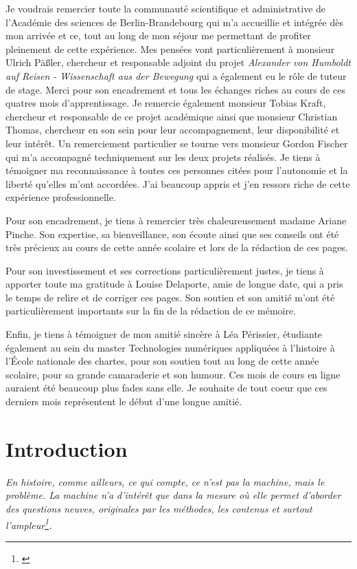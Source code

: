 \documentclass[a4paper, 12pt, twoside]{book}
\begin{document}
Je voudrais remercier toute la communauté scientifique et administrative de l'Académie des sciences de Berlin-Brandebourg qui m'a accueillie et intégrée dès mon arrivée et ce, tout au long de mon séjour me permettant de profiter pleinement de cette expérience. Mes pensées vont particulièrement à monsieur Ulrich Päßler, chercheur et responsable adjoint du projet \textit{Alexander von Humboldt auf Reisen - Wissenschaft aus der Bewegung} qui a également eu le rôle de tuteur de stage. Merci pour son encadrement et tous les échanges riches au cours de ces quatres mois d'apprentissage. Je remercie également monsieur Tobias Kraft, chercheur et responsable de ce projet académique ainsi que monsieur Christian Thomas, chercheur en son sein pour leur accompagnement, leur disponibilité et leur intérêt. Un remerciement particulier se tourne vers monsieur Gordon Fischer qui m'a accompagné techniquement sur les deux projets réalisés. Je tiens à témoigner ma reconnaissance à toutes ces personnes citées pour l'autonomie et la liberté qu'elles m'ont accordées. J'ai beaucoup appris et j'en ressors riche de cette expérience professionnelle. 

Pour son encadrement, je tiens à remercier très chaleureusement madame Ariane Pinche. Son expertise, sa bienveillance, son écoute ainsi que ses conseils ont été très précieux au cours de cette année scolaire et lors de la rédaction de ces pages.

Pour son investissement et ses corrections particulièrement justes, je tiens à apporter toute ma gratitude à Louise Delaporte, amie de longue date, qui a pris le temps de relire et de corriger ces pages. Son soutien et son amitié m'ont été particulièrement importants sur la fin de la rédaction de ce mémoire. 

Enfin, je tiens à témoigner de mon amitié sincère à Léa Périssier, étudiante également au sein du master Technologies numériques appliquées à l'histoire à l'École nationale des chartes, pour son soutien tout au long de cette année scolaire, pour sa grande camaraderie et son humour. Ces mois de cours en ligne auraient été beaucoup plus fades sans elle. Je souhaite de tout coeur que ces derniers mois représentent le début d'une longue amitié. 

\tableofcontents

\mainmatter %
\chapter*{Introduction}
\begin{changemargin}{1cm}{1cm}
\textit{
En histoire, comme ailleurs, ce qui compte, ce n'est pas la machine, mais le problème. La machine n'a d'intérêt que dans la mesure où elle permet d'aborder des questions neuves, originales par les méthodes, les contenus et surtout l'ampleur\footnote{\cite{le_roy_ladurie_fin_1968}}.}
\end{changemargin}
\end{document}
